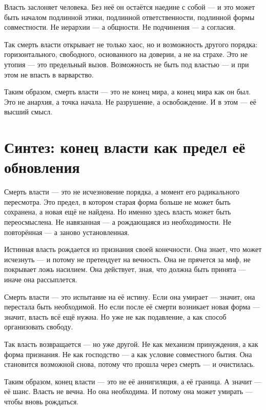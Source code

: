 Власть заслоняет человека. Без неё он остаётся наедине с собой — и это может быть началом подлинной этики, подлинной ответственности, подлинной формы совместности. Не иерархии — а общности. Не подчинения — а согласия.

Так смерть власти открывает не только хаос, но и возможность другого порядка: горизонтального, свободного, основанного на доверии, а не на страхе. Это не утопия — это предельный вызов. Возможность не быть под властью — и при этом не впасть в варварство.

Таким образом, смерть власти — это не конец мира, а конец мира как он был. Это не анархия, а точка начала. Не разрушение, а освобождение. И в этом — её высший смысл.

\section{Синтез: конец власти как предел её обновления}

Смерть власти — это не исчезновение порядка, а момент его радикального пересмотра. Это предел, в котором старая форма больше не может быть сохранена, а новая ещё не найдена. Но именно здесь власть может быть переосмыслена. Не навязанная — а рождающаяся из необходимости. Не повторённая — а заново установленная.

Истинная власть рождается из признания своей конечности. Она знает, что может исчезнуть — и потому не претендует на вечность. Она не прячется за миф, не покрывает ложь насилием. Она действует, зная, что должна быть принята — иначе она рассыплется.

Смерть власти — это испытание на её истину. Если она умирает — значит, она перестала быть необходимой. Но если после её смерти возникает новая форма — значит, власть всё ещё нужна. Но уже не как подавление, а как способ организовать свободу.

Так власть возвращается — но уже другой. Не как механизм принуждения, а как форма признания. Не как господство — а как условие совместного бытия. Она становится возможной снова, потому что прошла через смерть — и очистилась.

Таким образом, конец власти — это не её аннигиляция, а её граница. А значит — её шанс. Власть не вечна. Но она необходима. И потому она может умирать — чтобы вновь рождаться.
